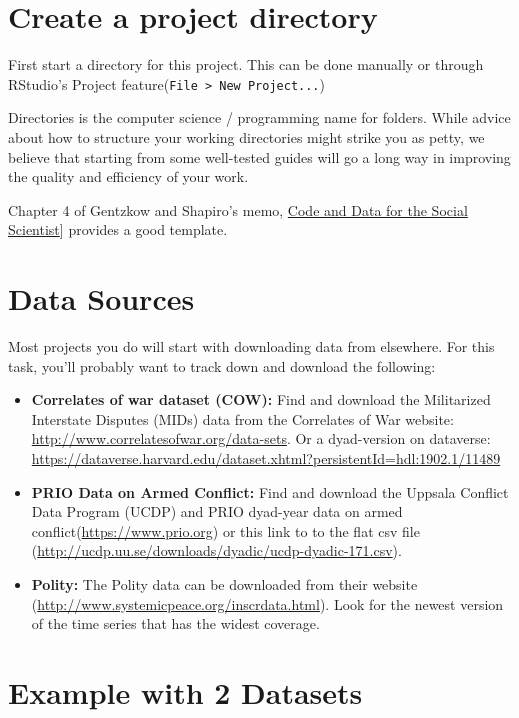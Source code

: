 \documentclass[]{book}
\providecommand{\tightlist}{%
  \setlength{\itemsep}{0pt}\setlength{\parskip}{0pt}}
\theoremstyle{definition}
\theoremstyle{definition}
\theoremstyle{definition}
\theoremstyle{remark}
\begin{document}
\section{Create a project directory}\label{create-a-project-directory}

First start a directory for this project. This can be done manually or
through RStudio's Project
feature(\texttt{File\ \textgreater{}\ New\ Project...})

Directories is the computer science / programming name for folders.
While advice about how to structure your working directories might
strike you as petty, we believe that starting from some well-tested
guides will go a long way in improving the quality and efficiency of
your work.

Chapter 4 of Gentzkow and Shapiro's memo,
\href{https://web.stanford.edu/~gentzkow/research/CodeAndData.pdf}{Code
and Data for the Social Scientist}{]} provides a good template.

\section{Data Sources}\label{data-sources}

Most projects you do will start with downloading data from elsewhere.
For this task, you'll probably want to track down and download the
following:

\begin{itemize}
\tightlist
\item
  \textbf{Correlates of war dataset (COW):} Find and download the
  Militarized Interstate Disputes (MIDs) data from the Correlates of War
  website: \url{http://www.correlatesofwar.org/data-sets}. Or a
  dyad-version on dataverse:
  \url{https://dataverse.harvard.edu/dataset.xhtml?persistentId=hdl:1902.1/11489}
\item
  \textbf{PRIO Data on Armed Conflict:} Find and download the Uppsala
  Conflict Data Program (UCDP) and PRIO dyad-year data on armed
  conflict(\url{https://www.prio.org}) or this link to to the flat csv
  file (\url{http://ucdp.uu.se/downloads/dyadic/ucdp-dyadic-171.csv}).
\item
  \textbf{Polity:} The Polity data can be downloaded from their website
  (\url{http://www.systemicpeace.org/inscrdata.html}). Look for the
  newest version of the time series that has the widest coverage.
\end{itemize}

\section{Example with 2 Datasets}\label{example-with-2-datasets}
\end{document}
